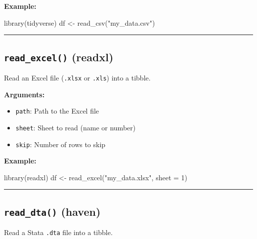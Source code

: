 \documentclass[
  letterpaper,
  DIV=11,
  numbers=noendperiod]{scrreprt}
\newenvironment{Shaded}{\begin{snugshade}}{\end{snugshade}}
\newcommand{\AttributeTok}[1]{\textcolor[rgb]{0.40,0.45,0.13}{#1}}
\newcommand{\DecValTok}[1]{\textcolor[rgb]{0.68,0.00,0.00}{#1}}
\newcommand{\FunctionTok}[1]{\textcolor[rgb]{0.28,0.35,0.67}{#1}}
\newcommand{\NormalTok}[1]{\textcolor[rgb]{0.00,0.23,0.31}{#1}}
\newcommand{\OtherTok}[1]{\textcolor[rgb]{0.00,0.23,0.31}{#1}}
\newcommand{\StringTok}[1]{\textcolor[rgb]{0.13,0.47,0.30}{#1}}
\providecommand{\tightlist}{%
  \setlength{\itemsep}{0pt}\setlength{\parskip}{0pt}}
\begin{document}
\textbf{Example:}

\begin{Shaded}
\begin{Highlighting}[]
\FunctionTok{library}\NormalTok{(tidyverse)}
\NormalTok{df }\OtherTok{\textless{}{-}} \FunctionTok{read\_csv}\NormalTok{(}\StringTok{"my\_data.csv"}\NormalTok{)}
\end{Highlighting}
\end{Shaded}

\begin{center}\rule{0.5\linewidth}{0.5pt}\end{center}

\subsection{\texorpdfstring{\texttt{read\_excel()}
(readxl)}{read\_excel() (readxl)}}\label{read_excel-readxl}

Read an Excel file (\texttt{.xlsx} or \texttt{.xls}) into a tibble.

\textbf{Arguments:}

\begin{itemize}
\tightlist
\item
  \texttt{path}: Path to the Excel file
\item
  \texttt{sheet}: Sheet to read (name or number)
\item
  \texttt{skip}: Number of rows to skip
\end{itemize}

\textbf{Example:}

\begin{Shaded}
\begin{Highlighting}[]
\FunctionTok{library}\NormalTok{(readxl)}
\NormalTok{df }\OtherTok{\textless{}{-}} \FunctionTok{read\_excel}\NormalTok{(}\StringTok{"my\_data.xlsx"}\NormalTok{, }\AttributeTok{sheet =} \DecValTok{1}\NormalTok{)}
\end{Highlighting}
\end{Shaded}

\begin{center}\rule{0.5\linewidth}{0.5pt}\end{center}

\subsection{\texorpdfstring{\texttt{read\_dta()}
(haven)}{read\_dta() (haven)}}\label{read_dta-haven}

Read a Stata \texttt{.dta} file into a tibble.
\end{document}
